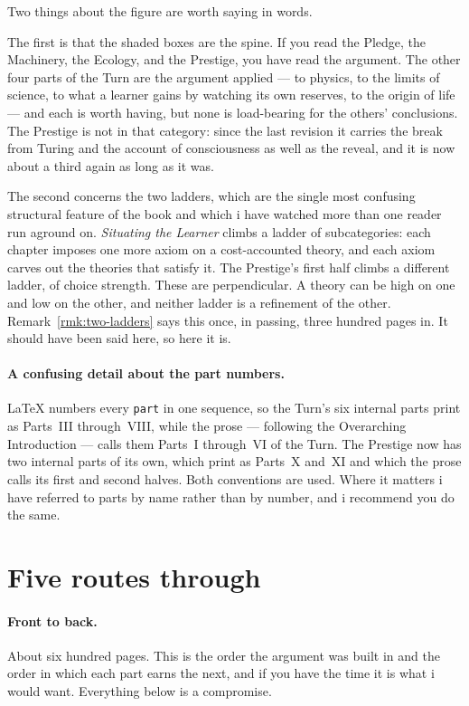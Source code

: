 Two things about the figure are worth saying in words.

The first is that the shaded boxes are the spine.
If you read the Pledge, the Machinery, the Ecology, and the
Prestige, you have read the argument.
The other four parts of the Turn are the argument applied --- to
physics, to the limits of science, to what a learner gains by watching
its own reserves, to the origin of life --- and each is worth having, but
none is load-bearing for the others' conclusions.
The Prestige is not in that category: since the last revision it carries
the break from Turing and the account of consciousness as well as the
reveal, and it is now about a third again as long as it was.

The second concerns the two ladders, which are the single most
confusing structural feature of the book and which i have watched
more than one reader run aground on.
\emph{Situating the Learner} climbs a ladder of subcategories: each
chapter imposes one more axiom on a cost-accounted theory, and each
axiom carves out the theories that satisfy it.
The Prestige's first half climbs a different ladder, of choice
strength.
These are perpendicular.
A theory can be high on one and low on the other, and neither
ladder is a refinement of the other.
Remark~\ref{rmk:two-ladders} says this once, in passing, three
hundred pages in.
It should have been said here, so here it is.

\paragraph{A confusing detail about the part numbers.}
\LaTeX{} numbers every \texttt{part} in one sequence, so the Turn's
six internal parts print as Parts~III through~VIII, while the prose
--- following the Overarching Introduction --- calls them Parts~I
through~VI of the Turn.
The Prestige now has two internal parts of its own, which print as
Parts~X and~XI and which the prose calls its first and second halves.
Both conventions are used.
Where it matters i have referred to parts by name rather than by
number, and i recommend you do the same.

\section*{Five routes through}

\paragraph{Front to back.}
About six hundred pages.
This is the order the argument was built in and the order in which
each part earns the next, and if you have the time it is what i
would want.
Everything below is a compromise.

